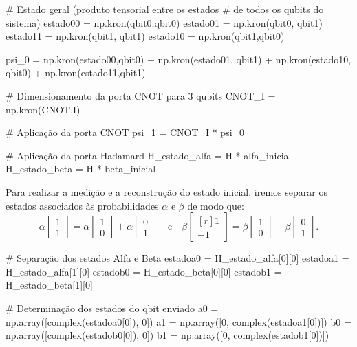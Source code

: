 \begin{pycode}
  # Estado geral (produto tensorial entre os estados
  # de todos os qubits do sistema)
  estado00 = np.kron(qbit0,qbit0)
  estado01 = np.kron(qbit0, qbit1)
  estado11 = np.kron(qbit1, qbit1)
  estado10 = np.kron(qbit1,qbit0)

  psi_0 = np.kron(estado00,qbit0) + np.kron(estado01, qbit1) +
          np.kron(estado10, qbit0) + np.kron(estado11,qbit1)

  # Dimensionamento da porta CNOT para 3 qubits
  CNOT_I = np.kron(CNOT,I)

  # Aplicação da porta CNOT
  psi_1 = CNOT_I * psi_0

  # Aplicação da porta Hadamard
  H_estado_alfa = H * alfa_inicial
  H_estado_beta = H * beta_inicial
\end{pycode}

Para realizar a medição e a reconstrução do estado inicial, iremos separar os estados associados às probabilidades \(\alpha\) e \(\beta\) de modo que:
\[
  \alpha \begin{bmatrix} 1 \\ 1 \end{bmatrix} = \alpha \begin{bmatrix} 1 \\ 0 \end{bmatrix} + \alpha \begin{bmatrix} 0 \\ 1 \end{bmatrix}
  \quad \text{e} \quad
  \beta \begin{bmatrix*}[r] 1 \\ -1 \end{bmatrix*} = \beta \begin{bmatrix} 1 \\ 0 \end{bmatrix} - \beta \begin{bmatrix} 0 \\ 1 \end{bmatrix}.
\]
\begin{pycode}
  # Separação dos estados Alfa e Beta
  estadoa0 = H_estado_alfa[0][0]
  estadoa1 = H_estado_alfa[1][0]
  estadob0 = H_estado_beta[0][0]
  estadob1 = H_estado_beta[1][0]

  # Determinação dos estados do qbit enviado
  a0 = np.array([complex(estadoa0[0]), 0])
  a1 = np.array([0, complex(estadoa1[0])])
  b0 = np.array([complex(estadob0[0]), 0])
  b1 = np.array([0, complex(estadob1[0])])
\end{pycode}

